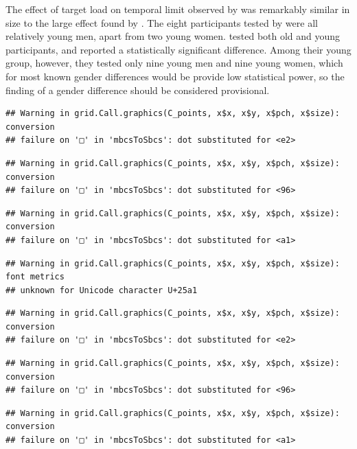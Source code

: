 \documentclass[
]{book}
\begin{document}
The effect of target load on temporal limit observed by \citet{roudaiaDifferentEffectsAging2017} was remarkably similar in size to the large effect found by \citet{holcombeSplittingAttentionReduces2013}. The eight participants tested by \citet{holcombeSplittingAttentionReduces2013} were all relatively young men, apart from two young women. \citet{roudaiaDifferentEffectsAging2017} tested both old and young participants, and reported a statistically significant difference. Among their young group, however, they tested only nine young men and nine young women, which for most known gender differences would be provide low statistical power, so the finding of a gender difference should be considered provisional.

\begin{verbatim}
## Warning in grid.Call.graphics(C_points, x$x, x$y, x$pch, x$size): conversion
## failure on '□' in 'mbcsToSbcs': dot substituted for <e2>
\end{verbatim}

\begin{verbatim}
## Warning in grid.Call.graphics(C_points, x$x, x$y, x$pch, x$size): conversion
## failure on '□' in 'mbcsToSbcs': dot substituted for <96>
\end{verbatim}

\begin{verbatim}
## Warning in grid.Call.graphics(C_points, x$x, x$y, x$pch, x$size): conversion
## failure on '□' in 'mbcsToSbcs': dot substituted for <a1>
\end{verbatim}

\begin{verbatim}
## Warning in grid.Call.graphics(C_points, x$x, x$y, x$pch, x$size): font metrics
## unknown for Unicode character U+25a1
\end{verbatim}

\begin{verbatim}
## Warning in grid.Call.graphics(C_points, x$x, x$y, x$pch, x$size): conversion
## failure on '□' in 'mbcsToSbcs': dot substituted for <e2>
\end{verbatim}

\begin{verbatim}
## Warning in grid.Call.graphics(C_points, x$x, x$y, x$pch, x$size): conversion
## failure on '□' in 'mbcsToSbcs': dot substituted for <96>
\end{verbatim}

\begin{verbatim}
## Warning in grid.Call.graphics(C_points, x$x, x$y, x$pch, x$size): conversion
## failure on '□' in 'mbcsToSbcs': dot substituted for <a1>
\end{verbatim}
\end{document}
